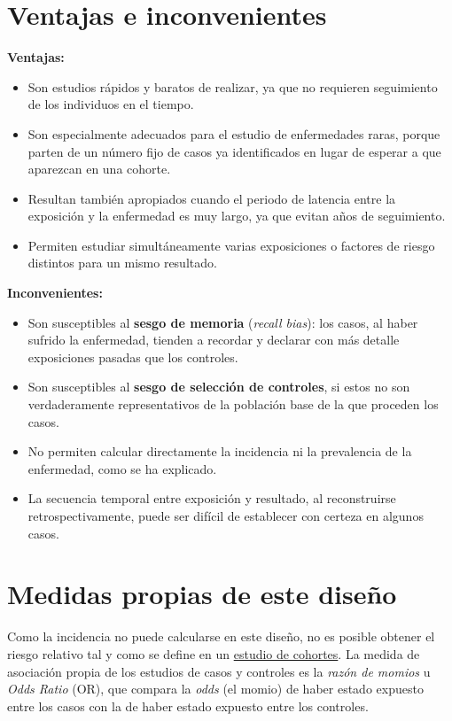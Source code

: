 \documentclass[
  spanish,
  a4paper,
]{scrreport}
\providecommand{\tightlist}{%
  \setlength{\itemsep}{0pt}\setlength{\parskip}{0pt}}
\theoremstyle{definition}
\theoremstyle{definition}
\theoremstyle{remark}
\begin{document}
\section{Ventajas e inconvenientes}\label{ventajas-e-inconvenientes-3}

\textbf{Ventajas:}

\begin{itemize}
\tightlist
\item
  Son estudios rápidos y baratos de realizar, ya que no requieren
  seguimiento de los individuos en el tiempo.
\item
  Son especialmente adecuados para el estudio de enfermedades raras,
  porque parten de un número fijo de casos ya identificados en lugar de
  esperar a que aparezcan en una cohorte.
\item
  Resultan también apropiados cuando el periodo de latencia entre la
  exposición y la enfermedad es muy largo, ya que evitan años de
  seguimiento.
\item
  Permiten estudiar simultáneamente varias exposiciones o factores de
  riesgo distintos para un mismo resultado.
\end{itemize}

\textbf{Inconvenientes:}

\begin{itemize}
\tightlist
\item
  Son susceptibles al \textbf{sesgo de memoria} (\emph{recall bias}):
  los casos, al haber sufrido la enfermedad, tienden a recordar y
  declarar con más detalle exposiciones pasadas que los controles.
\item
  Son susceptibles al \textbf{sesgo de selección de controles}, si estos
  no son verdaderamente representativos de la población base de la que
  proceden los casos.
\item
  No permiten calcular directamente la incidencia ni la prevalencia de
  la enfermedad, como se ha explicado.
\item
  La secuencia temporal entre exposición y resultado, al reconstruirse
  retrospectivamente, puede ser difícil de establecer con certeza en
  algunos casos.
\end{itemize}

\section{Medidas propias de este
diseño}\label{medidas-propias-de-este-diseuxf1o-3}

Como la incidencia no puede calcularse en este diseño, no es posible
obtener el riesgo relativo tal y como se define en un
\hyperref[estudios-de-cohortes]{estudio de cohortes}. La medida de
asociación propia de los estudios de casos y controles es la \emph{razón
de momios} u \emph{Odds Ratio} (OR), que compara la \emph{odds} (el
momio) de haber estado expuesto entre los casos con la de haber estado
expuesto entre los controles.
\end{document}
